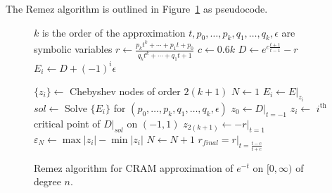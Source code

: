 The Remez algorithm is outlined in Figure~\ref{remez-pseudocode} as pseudocode.

\begin{figure}
  \caption{Remez algorithm for CRAM approximation of $e^{-t}$ on $[0, \infty)$
  of degree $n$.}\label{remez-pseudocode}
  \begin{algorithmic}
    \STATE {}
    \STATE $k$ is the order of the approximation
    \STATE \COMMENT{translate $[0, \infty)$ to $[-1, 1)$}
    \STATE $t, p_0, \ldots, p_k, q_1, \ldots, q_k, \epsilon$ are symbolic variables
    \STATE $r \leftarrow \frac{p_kt^k + \cdots + p_1t + p_0}{q_kt^k + \cdots +
      q_1t + 1}$
    \STATE $c \leftarrow 0.6k$
    \STATE $D \leftarrow e^{c\frac{t+1}{t-1}} - r$
    \STATE $E_i \leftarrow D + (-1)^i\epsilon$

    \STATE $\{z_i\} \leftarrow$ Chebyshev nodes of order $2(k+1)$
    \STATE $N \leftarrow 1$
    \REPEAT
      \STATE $E_i \leftarrow E|_{z_i}$
      \STATE $sol \leftarrow$ Solve $\{E_i\}$ for $(p_0,\ldots,p_k,q_1,\ldots,q_k,\epsilon)$
      \STATE $z_0 \leftarrow D|_{t=-1}$
      \STATE $z_i \leftarrow$ $i^\mathrm{th}$ critical point of $D|_{sol}$ on
      $(-1, 1)$ 
      \STATE $z_{2(k + 1)} \leftarrow -r|_{t=1}$ 
      \STATE $\varepsilon_N \leftarrow \max{|z_i|} - \min{|z_i|}$
      \STATE $N \leftarrow N + 1$
    \STATE $r_{final} = r|_{t=\frac{t - c}{t + c}}$ \COMMENT{translate $[-1, 1)$ back to $[0, \infty)$ and normalize $q_0=1$}
  \end{algorithmic}
\end{figure}
